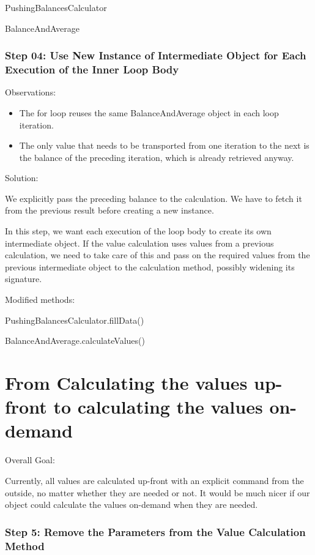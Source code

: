 \documentclass[a4paper,fleqn,titlepage,11pt]{article}
\begin{document}
PushingBalancesCalculator

BalanceAndAverage


\section*{Step 04: Use New Instance of Intermediate Object for Each Execution of the Inner Loop Body}

Observations:
\begin{itemize}
\item The for loop reuses the same BalanceAndAverage object in each loop iteration.
\item The only value that needs to be transported from one iteration to the next is the balance of the preceding iteration, which is already retrieved anyway.
\end{itemize}

Solution:

We explicitly pass the preceding balance to the calculation. We have to fetch it from the previous result before creating a new instance.

In this step, we want each execution of the loop body to create its own intermediate object. If the value calculation uses values from a previous calculation, we need to take care of this and pass on the required values from the previous intermediate object to the calculation method, possibly widening its signature.

Modified methods:

PushingBalancesCalculator.fillData()

BalanceAndAverage.calculateValues()

\part{From Calculating the values up-front to calculating the values on-demand}

Overall Goal:

Currently, all values are calculated up-front with an explicit command from the outside, no matter whether they are needed or not. It would be much nicer if our object could calculate the values on-demand when they are needed.


\section*{Step 5: Remove the Parameters from the Value Calculation Method}
\end{document}
